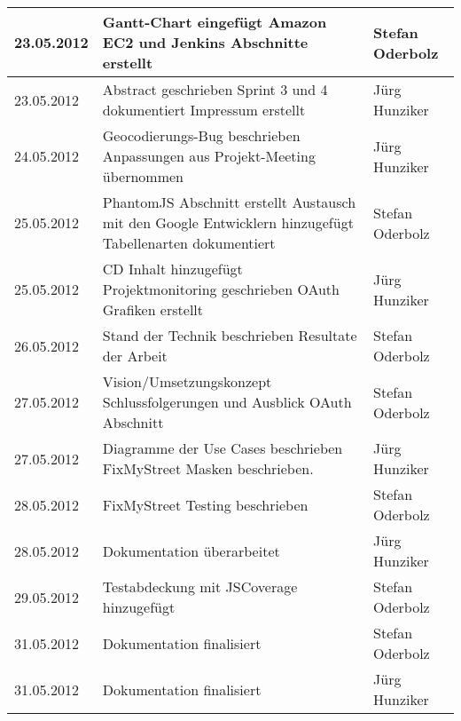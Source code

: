 \begin{longtable}{|p{0.15\threecelltabwidth}|p{0.65\threecelltabwidth}|p{0.2\threecelltabwidth}|}
\hline
23.05.2012  & Gantt-Chart eingefügt \newline Amazon EC2 und Jenkins Abschnitte erstellt & Stefan Oderbolz \\
\hline
23.05.2012  & Abstract geschrieben \newline Sprint 3 und 4 dokumentiert \newline Impressum erstellt & Jürg Hunziker \\
\hline
24.05.2012  & Geocodierungs-Bug beschrieben \newline Anpassungen aus Projekt-Meeting übernommen & Jürg Hunziker \\
\hline
25.05.2012  & PhantomJS Abschnitt erstellt \newline Austausch mit den Google Entwicklern hinzugefügt \newline Tabellenarten dokumentiert & Stefan Oderbolz \\
\hline
25.05.2012  & CD Inhalt hinzugefügt \newline Projektmonitoring geschrieben \newline OAuth Grafiken erstellt & Jürg Hunziker \\
\hline
26.05.2012  & Stand der Technik beschrieben \newline Resultate der Arbeit & Stefan Oderbolz \\
\hline
27.05.2012  & Vision/Umsetzungskonzept \newline Schlussfolgerungen und Ausblick \newline OAuth Abschnitt & Stefan Oderbolz \\
\hline
27.05.2012  & Diagramme der Use Cases beschrieben \newline FixMyStreet Masken beschrieben. & Jürg Hunziker \\
\hline
28.05.2012  & FixMyStreet Testing beschrieben & Stefan Oderbolz \\
\hline
28.05.2012  & Dokumentation überarbeitet & Jürg Hunziker \\
\hline
29.05.2012  & Testabdeckung mit JSCoverage hinzugefügt & Stefan Oderbolz \\
\hline
31.05.2012  & Dokumentation finalisiert & Stefan Oderbolz \\
\hline
31.05.2012  & Dokumentation finalisiert & Jürg Hunziker \\
\hline 
\end{longtable} 